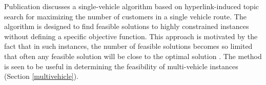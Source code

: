 \documentclass[dissertation,draft*]{aaltoseries}
\begin{document}
Publication  discusses a single-vehicle algorithm based on hyperlink-induced topic search \cite{kleinberg} 
for maximizing the number of customers in a single vehicle route. The algorithm is designed to find feasible solutions to highly constrained
instances without defining a specific objective function. This approach is motivated by the fact that
in such instances, the number of feasible solutions becomes so limited that often
any feasible solution will be close to the optimal solution \cite{psaraftis02}.
The method is seen to
be useful in determining the feasibility of multi-vehicle instances (Section \ref{multivehicle}). 


\end{document}
